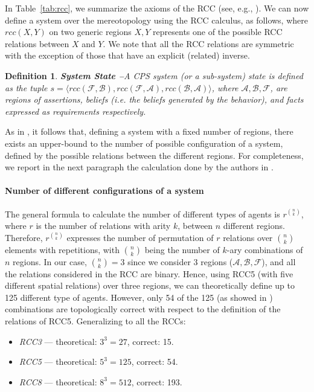 \documentclass[conference]{IEEEtran}
\newcommand{\assertionRegion}{\mathcal{A}}
\newcommand{\beliefRegion}{\mathcal{B}}
\newcommand{\factRegion}{\mathcal{F}}
\newcommand{\rcc}{rcc}
\newtheorem{definition}{Definition}%
\begin{document}
In Table~\ref{tab:rcc}, we summarize the axioms of the RCC (see, e.g., \autocite{Grutter2008rcc}).  We can now define a system
over the mereotopology using the RCC calculus, as follows, where $\rcc(X,Y)$ on
two generic regions $X,Y$ represents one of the possible RCC relations between
$X$ and $Y$. We note that all the RCC relations are symmetric with the exception
of those that have an explicit (related) inverse.

\begin{definition}{\bf System State --}\label{def:opsystem}
	A CPS system (or a sub-system) state is defined as the tuple
	$s=\langle\rcc(\factRegion,\beliefRegion),\rcc(\factRegion,\assertionRegion),\rcc(\beliefRegion,\assertionRegion)\rangle$,
	where $\assertionRegion,\beliefRegion,\factRegion$, are regions of
	assertions, beliefs (i.e. the beliefs generated by the behavior), and
	facts expressed as requirements respectively.
\end{definition}

As in \autocite{Santaca2016abf}, it follows that, defining
a system with a fixed number of regions, there exists
an upper-bound to the number of possible configuration of a system, defined by
the possible relations between the different regions.
For completeness, we report in the next paragraph 
the calculation done by the authors in \autocite{Santaca2016abf}.

\paragraph{Number of different configurations of a system}
The general formula to calculate the number of different types of agents is
$r^{\binom{n}{k}}$, where $r$ is the number of relations with arity $k$,
between $n$ different regions. Therefore, $r^{\binom{n}{k}}$
expresses the number of permutation of $r$
relations over ${\binom{n}{k}}$ elements with repetitions, 
with ${\binom{n}{k}}$ being the number of
$k$-ary combinations of $n$ regions.
In our case, $\binom{n}{k}=3$ since we consider $3$ regions 
($\assertionRegion,\beliefRegion,\factRegion$), and all the relations
considered in the RCC are binary.  Hence, using RCC5 (with five different
spatial relations) over three regions, we can theoretically define up to 125
different type of agents. However, only 54 of the 125 (as showed in
\autocite{improvingRCC}) combinations are topologically correct with respect to
the definition of the relations of RCC5. Generalizing to all the RCCs:

\begin{itemize}%
\item \emph{RCC3} --- theoretical: $3^3=27$,  correct: 15.
\item \emph{RCC5} --- theoretical: $5^3=125$, correct: 54.
\item \emph{RCC8} --- theoretical: $8^3=512$, correct: 193.
\end{itemize}
\end{document}
